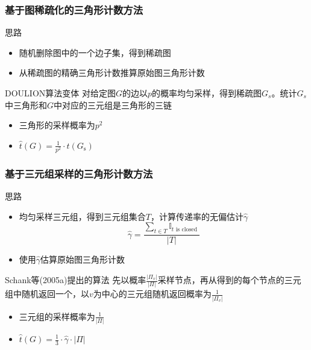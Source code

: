 \documentclass{beamer}
\begin{document}
\begin{frame}
\frametitle{基于图稀疏化的三角形计数方法} 
思路
\begin{itemize}
    \item 随机删除图中的一个边子集，得到稀疏图
    \item 从稀疏图的精确三角形计数推算原始图三角形计数
\end{itemize}
\begin{block}{DOULION算法变体\cite{etemadi2016efficient}}
对给定图$G$的边以$p$的概率均匀采样，得到稀疏图$G_s$。统计$G_s$中三角形和$G$中对应的三元组是三角形的三链
\begin{itemize}
    \item 三角形的采样概率为$p^2$
    \item $\hat{t}(G)=\frac{1}{ p^{2}} \cdot t\left(G_{\mathrm{s}}\right)$
\end{itemize}
\end{block}
\end{frame}

\begin{frame}
\frametitle{基于三元组采样的三角形计数方法} 
思路
\begin{itemize}
    \item 均匀采样三元组，得到三元组集合$T$，计算传递率的无偏估计$\hat{\gamma}$
    \begin{equation}
        \hat{\gamma}=\frac{\sum_{t \in T} \mathbb{I}_{t \text { is closed }}}{|T|}
        \label{eq:app_trans}
    \end{equation}
    \item 使用$\hat{\gamma}$估算原始图三角形计数
\end{itemize}
\begin{block}{Schank等(2005a)提出的算法\cite{schank2005approximating}}
    先以概率$\frac{|\Pi_{v}|}{|\Pi|}$采样节点，再从得到的每个节点的三元组中随机返回一个，以$v$为中心的三元组随机返回概率为$\frac{1}{|\Pi_v|}$
    \begin{itemize}
        \item 三元组的采样概率为$\frac{1}{|\Pi|}$
        \item $\hat{t}(G)=\frac{1}{3} \cdot \hat{\gamma} \cdot|\Pi|$
    \end{itemize}
\end{block}
\end{frame}
\end{document}
